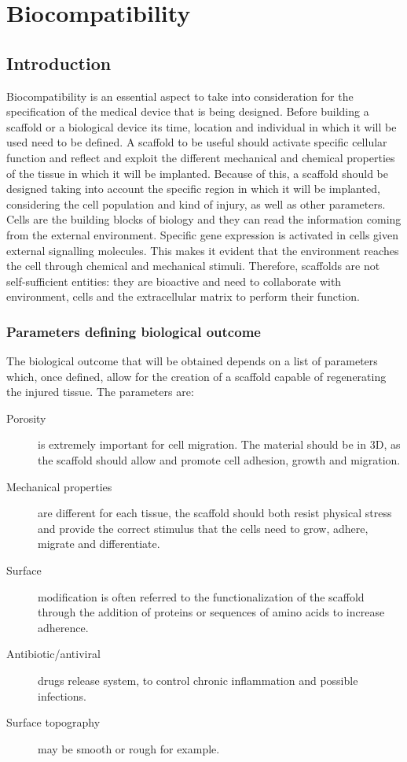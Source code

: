 \graphicspath{{chapters/02/images/}}
\chapter{Biocompatibility}

\section{Introduction}
Biocompatibility is an essential aspect to take into consideration for the specification of the medical device that is being designed.
Before building a scaffold or a biological device its time, location and individual in which it will be used need to be defined.
A scaffold to be useful should activate specific cellular function and reflect and exploit the different mechanical and chemical properties of the tissue in which it will be implanted.
Because of this, a scaffold should be designed taking into account the specific region in which it will be implanted, considering the cell population and kind of injury, as well as other parameters.
Cells are the building blocks of biology and they can read the information coming from the external environment.
Specific gene expression is activated in cells given external signalling molecules.
This makes it evident that the environment reaches the cell through chemical and mechanical stimuli.
Therefore, scaffolds are not self-sufficient entities: they are bioactive and need to collaborate with environment, cells and the extracellular matrix to perform their function.

	\subsection{Parameters defining biological outcome}
	The biological outcome that will be obtained depends on a list of parameters which, once defined, allow for the creation of a scaffold capable of regenerating the injured tissue.
	The parameters are:

	\begin{multicols}{2}
		\begin{description}
		\item[Porosity] is extremely important for cell migration.
			The material should be in 3D, as  the scaffold should allow and promote cell adhesion, growth and migration.
		\item[Mechanical properties] are different for each tissue, the scaffold should both resist physical stress and provide the correct stimulus that the cells need to grow, adhere, migrate and differentiate.
		\item[Surface] modification is often referred to the functionalization of the scaffold through the addition of proteins or sequences of amino acids to increase adherence.
		\item[Antibiotic/antiviral] drugs release system, to control chronic inflammation and possible infections.
		\item[Surface topography] may be smooth or rough for example.
		\end{description}
	\end{multicols}

